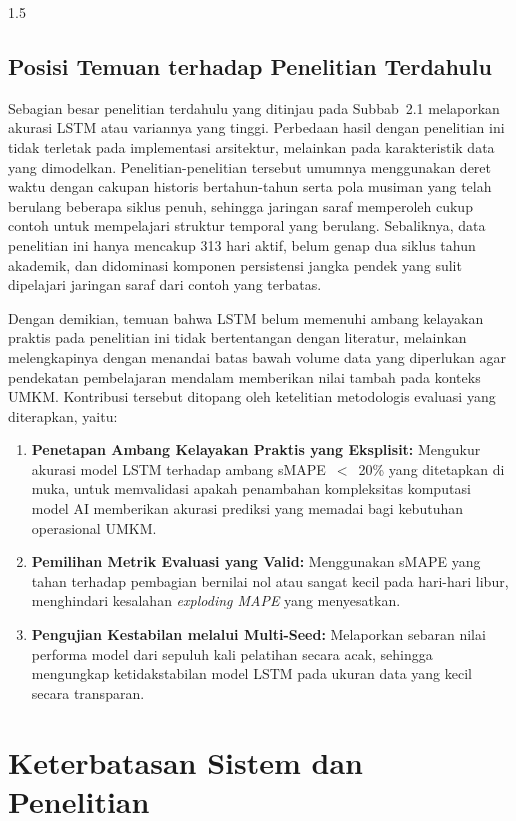 \documentclass[12pt, a4paper, onecolumn, oneside]{report}
\begin{document}
\begin{spacing}{1.5}
\subsection{Posisi Temuan terhadap Penelitian Terdahulu}
Sebagian besar penelitian terdahulu yang ditinjau pada Subbab~2.1 melaporkan akurasi LSTM atau variannya yang tinggi. Perbedaan hasil dengan penelitian ini tidak terletak pada implementasi arsitektur, melainkan pada karakteristik data yang dimodelkan. Penelitian-penelitian tersebut umumnya menggunakan deret waktu dengan cakupan historis bertahun-tahun serta pola musiman yang telah berulang beberapa siklus penuh, sehingga jaringan saraf memperoleh cukup contoh untuk mempelajari struktur temporal yang berulang. Sebaliknya, data penelitian ini hanya mencakup 313 hari aktif, belum genap dua siklus tahun akademik, dan didominasi komponen persistensi jangka pendek yang sulit dipelajari jaringan saraf dari contoh yang terbatas.

Dengan demikian, temuan bahwa LSTM belum memenuhi ambang kelayakan praktis pada penelitian ini tidak bertentangan dengan literatur, melainkan melengkapinya dengan menandai batas bawah volume data yang diperlukan agar pendekatan pembelajaran mendalam memberikan nilai tambah pada konteks UMKM. Kontribusi tersebut ditopang oleh ketelitian metodologis evaluasi yang diterapkan, yaitu:
\begin{enumerate}
    \item \textbf{Penetapan Ambang Kelayakan Praktis yang Eksplisit:} Mengukur akurasi model LSTM terhadap ambang sMAPE~$<$~20\% yang ditetapkan di muka, untuk memvalidasi apakah penambahan kompleksitas komputasi model AI memberikan akurasi prediksi yang memadai bagi kebutuhan operasional UMKM.
    \item \textbf{Pemilihan Metrik Evaluasi yang Valid:} Menggunakan sMAPE yang tahan terhadap pembagian bernilai nol atau sangat kecil pada hari-hari libur, menghindari kesalahan \textit{exploding MAPE} yang menyesatkan.
    \item \textbf{Pengujian Kestabilan melalui Multi-Seed:} Melaporkan sebaran nilai performa model dari sepuluh kali pelatihan secara acak, sehingga mengungkap ketidakstabilan model LSTM pada ukuran data yang kecil secara transparan.
\end{enumerate}

\section{Keterbatasan Sistem dan Penelitian}


\end{spacing}
\end{document}
